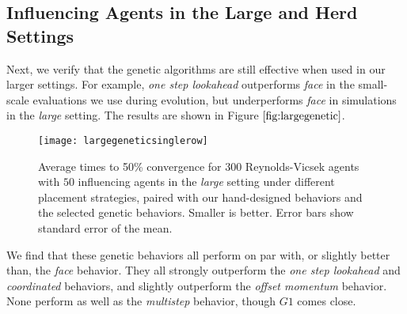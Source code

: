 \subsection{Influencing Agents in the Large and Herd Settings}
Next, we verify that the genetic algorithms are still effective when used in
our larger settings.
For example, \textit{one step lookahead} outperforms \textit{face} in the
small-scale evaluations we use during evolution, but underperforms \textit{face}
in simulations in the \textit{large} setting.
The results are shown in Figure $\ref{fig:largegenetic}$.

\begin{figure}
    \centering
    \texttt{[image: largegeneticsinglerow]}
    \caption{Average times to 50\% convergence for $300$ Reynolds-Vicsek agents
    with $50$ influencing agents in the \textit{large} setting under different
    placement strategies, paired with our hand-designed behaviors and the
    selected genetic behaviors.
    Smaller is better.
    Error bars show standard error of the mean.}
    \label{fig:largegenetic}
\end{figure}
We find that these genetic behaviors all perform on par with, or slightly
better than, the \textit{face} behavior.
They all strongly outperform the \textit{one step lookahead} and
\textit{coordinated} behaviors, and slightly outperform the
\textit{offset momentum} behavior.
None perform as well as the \textit{multistep} behavior, though $\textit{G1}$
comes close.

%

